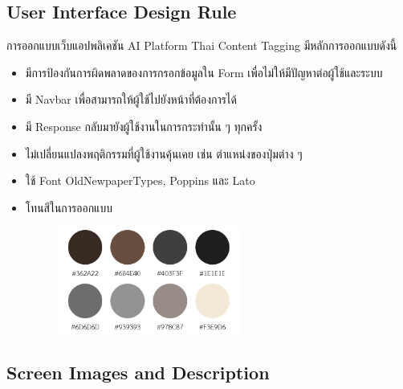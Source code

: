 \documentclass[12pt,oneside,openright,a4paper]{cpe-thai-project}
\begin{document}
\begin{itemize}
\subsection{User Interface Design Rule}
การออกแบบเว็บแอปพลิเคชัน AI Platform Thai Content Tagging มีหลักการออกแบบดังนี้
\begin{itemize}
  \item มีการป้องกันการผิดพลาดของการกรอกข้อมูลใน Form เพื่อไม่ให้มีปัญหาต่อผู้ใช้และระบบ
  \item มี Navbar เพื่อสามารถให้ผู้ใช้ไปยังหน้าที่ต้องการได้
  \item มี Response กลับมายังผู้ใช้งานในการกระทำนั้น ๆ ทุกครั้ง
  \item ไม่เปลี่ยนแปลงพฤติกรรมที่ผู้ใช้งานคุ้นเคย เช่น ตำแหน่งของปุ่มต่าง ๆ
  \item ใช้ Font OldNewpaperTypes, Poppins และ Lato
  \item โทนสีในการออกแบบ 
        \begin{figure}[!ht]\centering
          \includegraphics[height=3.5cm]{./img/color.png} 
        \end{figure}
\end{itemize}

\newpage
\subsection{Screen Images and Description}

\end{itemize}
\end{document}
